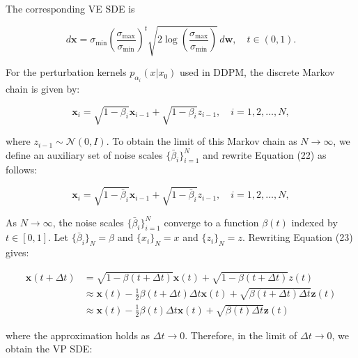 \noindent
The corresponding VE SDE is 

\begin{equation}
    d \mathbf{x} = \sigma_{\min} \left( \frac{\sigma_{\max}}{\sigma_{\min}} \right) ^t \sqrt{2 \log \left( \frac{\sigma_{\max}}{\sigma_{\min}} \right) } \, d \mathbf{w}, \quad t \in (0, 1).
\end{equation}

\noindent
For the perturbation kernels \( p_{\alpha_i}(x | x_0) \) used in DDPM, the discrete Markov chain is given by:

\begin{equation}
\mathbf{x}_i = \sqrt{1 - \beta_i} \mathbf{x}_{i-1} + \sqrt{1 - \beta_i} z_{i-1}, \quad i = 1, 2, \ldots, N,
\end{equation}

\noindent
where \( z_{i-1} \sim \mathcal{N}(0, I) \). To obtain the limit of this Markov chain as \( N \to \infty \), we define an auxiliary set of noise scales \( \{ \bar{\beta}_i \}_{i=1}^N \) and rewrite Equation (22) as follows:

\begin{equation}
\mathbf{x}_i = \sqrt{1 - \bar{\beta}_i} \mathbf{x}_{i-1} + \sqrt{1 - \bar{\beta}_i} z_{i-1}, \quad i = 1, 2, \ldots, N,
\end{equation}

\noindent
As \( N \to \infty \), the noise scales \( \{ \bar{\beta}_i \}_{i=1}^N \) converge to a function \( \beta(t) \) indexed by \( t \in [0, 1] \). Let \( \{ \bar{\beta}_i \}_{N} = \beta \) and \( \{ x_i \}_{N} = x \) and \( \{ z_i \}_{N} = z \). Rewriting Equation (23) gives:

\begin{equation}
\begin{aligned}
    \mathbf{x}(t + \Delta t) &= \sqrt{1 - \beta(t + \Delta t)} \mathbf{x}(t) + \sqrt{1 - \beta(t + \Delta t)} z(t) \\ &\approx \mathbf{x}(t) -\frac{1}{2}\beta(t + \Delta t) \Delta t \mathbf{x}(t)+\sqrt{\beta(t + \Delta t) \Delta t } \mathbf{z} (t) \\
    &\approx \mathbf{x}(t) -\frac{1}{2}\beta(t ) \Delta t \mathbf{x}(t)+\sqrt{\beta(t ) \Delta t } \mathbf{z} (t) 
\end{aligned} 
\end{equation}

\noindent
where the approximation holds as \( \Delta t \to 0 \). Therefore, in the limit of \( \Delta t \to 0 \), we obtain the VP SDE:

